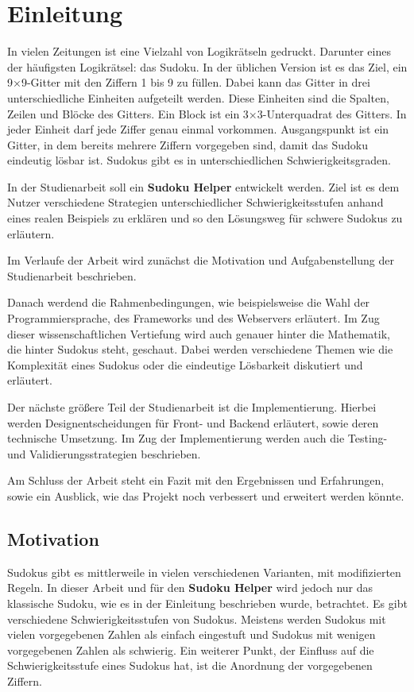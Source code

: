 
\chapter{Einleitung}
In vielen Zeitungen ist eine Vielzahl von Logikrätseln gedruckt. Darunter eines der häufigsten Logikrätsel: das Sudoku.
In der üblichen Version ist es das Ziel, ein 9×9-Gitter mit den Ziffern 1 bis 9 zu füllen. Dabei kann das Gitter in drei unterschiedliche Einheiten aufgeteilt werden. Diese Einheiten sind die Spalten, Zeilen und Blöcke des Gitters. Ein Block ist ein 3×3-Unterquadrat des Gitters. In jeder Einheit darf jede Ziffer genau einmal vorkommen.
Ausgangspunkt ist ein Gitter, in dem bereits mehrere Ziffern vorgegeben sind, damit das Sudoku eindeutig lösbar ist. Sudokus gibt es in unterschiedlichen Schwierigkeitsgraden. 

In der Studienarbeit soll ein \textbf{Sudoku Helper} entwickelt werden. Ziel ist es dem Nutzer verschiedene Strategien unterschiedlicher Schwierigkeitsstufen anhand eines realen Beispiels zu erklären und so den Lösungsweg für schwere Sudokus zu erläutern. \cite{FAZ} \cite{sudopedia_2022}

Im Verlaufe der Arbeit wird zunächst die Motivation und Aufgabenstellung der Studienarbeit beschrieben. 

Danach werdend die Rahmenbedingungen, wie beispielsweise die Wahl der Programmiersprache, des Frameworks und des Webservers erläutert. Im Zug dieser wissenschaftlichen Vertiefung wird auch genauer hinter die Mathematik, die hinter Sudokus steht, geschaut. Dabei werden verschiedene Themen wie die Komplexität eines Sudokus oder die eindeutige Lösbarkeit diskutiert und erläutert.

Der nächste größere Teil der Studienarbeit ist die Implementierung. Hierbei werden Designentscheidungen für Front- und Backend erläutert, sowie deren technische Umsetzung. Im Zug der Implementierung werden auch die Testing- und Validierungsstrategien beschrieben.

Am Schluss der Arbeit steht ein Fazit mit den Ergebnissen und Erfahrungen, sowie ein Ausblick, wie das Projekt noch verbessert und erweitert werden könnte.
 

\section{Motivation}
Sudokus gibt es mittlerweile in vielen verschiedenen Varianten, mit modifizierten Regeln. In dieser Arbeit und für den \textbf{Sudoku Helper} wird jedoch nur das klassische Sudoku, wie es in der Einleitung beschrieben wurde, betrachtet. Es gibt verschiedene Schwierigkeitsstufen von Sudokus. Meistens werden Sudokus mit vielen vorgegebenen Zahlen als einfach eingestuft und Sudokus mit wenigen vorgegebenen Zahlen als schwierig. Ein weiterer Punkt, der Einfluss auf die Schwierigkeitsstufe eines Sudokus hat, ist die Anordnung der vorgegebenen Ziffern.


